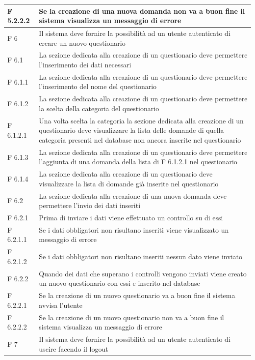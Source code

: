 \documentclass[a4paper,11pt]{article}
\begin{document}
\begin{longtable}{p{}p{}}
\midrule
F 5.2.2.2 & Se la creazione di una nuova domanda non va a buon fine il sistema visualizza un messaggio di errore\\
\midrule
F 6 & Il sistema deve fornire la possibilità ad un utente autenticato di creare un nuovo questionario\\
\midrule
F 6.1 & La sezione dedicata alla creazione di un questionario deve permettere l'inserimento dei dati necessari\\
\midrule
F 6.1.1 & La sezione dedicata alla creazione di un questionario deve permettere l'inserimento del nome del questionario\\
\midrule
F 6.1.2 & La sezione dedicata alla creazione di un questionario deve permettere la scelta della categoria del questionario\\
\midrule
F 6.1.2.1 & Una volta scelta la categoria la sezione dedicata alla creazione di un questionario deve visualizzare la lista delle domande di quella categoria presenti nel database non ancora inserite nel questionario\\
\midrule
F 6.1.3 & La sezione dedicata alla creazione di un questionario deve permettere l'aggiunta di una domanda della lista di F 6.1.2.1 nel questionario\\
\midrule
F 6.1.4 & La sezione dedicata alla creazione di un questionario deve visualizzare la lista di domande già inserite nel questionario\\
\midrule
F 6.2 & La sezione dedicata alla creazione di una nuova domanda deve permettere l'invio dei dati inseriti\\
\midrule
F 6.2.1 & Prima di inviare i dati viene effettuato un controllo su di essi\\
\midrule
F 6.2.1.1 & Se i dati obbligatori non risultano inseriti viene visualizzato un messaggio di errore\\
\midrule
F 6.2.1.2 & Se i dati obbligatori non risultano inseriti nessun dato viene inviato\\
\midrule
F 6.2.2 & Quando dei dati che superano i controlli vengono inviati viene creato un nuovo questionario con essi e inserito nel database\\
\midrule
F 6.2.2.1 & Se la creazione di un nuovo questionario va a buon fine il sistema avvisa l'utente\\
\midrule
F 6.2.2.2 & Se la creazione di un nuovo questionario non va a buon fine il sistema visualizza un messaggio di errore\\
\midrule
F 7 & Il sistema deve fornire la possibilità ad un utente autenticato di uscire facendo il logout\\
			
			\end{longtable}
\end{document}
